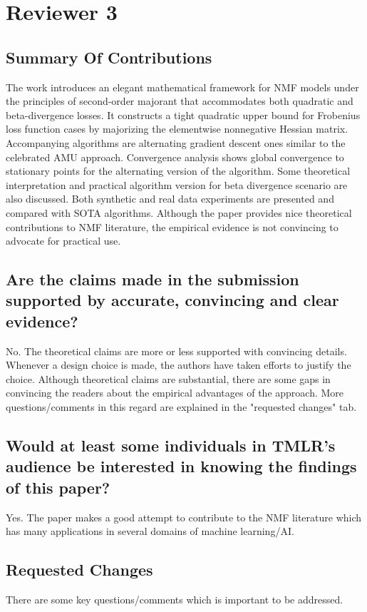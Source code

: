 \documentclass[10pt]{article} %
\begin{document}
\section{Reviewer 3}

\subsection{Summary Of Contributions}
The work introduces an elegant mathematical framework for NMF models under the principles of second-order majorant that accommodates both quadratic and beta-divergence losses. It constructs a tight quadratic upper bound for Frobenius loss function cases by majorizing the elementwise nonnegative Hessian matrix. Accompanying algorithms are alternating gradient descent ones similar to the celebrated AMU approach. Convergence analysis shows global convergence to stationary points for the alternating version of the algorithm. Some theoretical interpretation and practical algorithm version for beta divergence scenario are also discussed. Both synthetic and real data experiments are presented and compared with SOTA algorithms. Although the paper provides nice theoretical contributions to NMF literature, the empirical evidence is not convincing to advocate for practical use.

\subsection{Are the claims made in the submission supported by accurate, convincing and clear evidence?}
No. The theoretical claims are more or less supported with convincing details. Whenever a design choice is made, the authors have taken efforts to justify the choice. Although theoretical claims are substantial, there are some gaps in convincing the readers about the empirical advantages of the approach. More questions/comments in this regard are explained in the "requested changes" tab.

\subsection{Would at least some individuals in TMLR's audience be interested in knowing the findings of this paper?}
Yes. The paper makes a good attempt to contribute to the NMF literature which has many applications in several domains of machine learning/AI.

\subsection{Requested Changes}
There are some key questions/comments which is important to be addressed.
\end{document}
